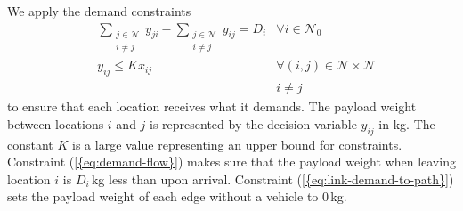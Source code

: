 \documentclass[journal]{IEEEtran}
\begin{document}
We apply the demand constraints
\begin{subequations}
\label{eq:demand-constraints}
\begin{align}
& {\ensuremath{\sum_{\substack {{j} \in {\ensuremath{\mathcal{N}}} \\ {i} \neq {j}}}}} {\ensuremath{{\ensuremath{y}}_{{j} {i}}}} - {\ensuremath{\sum_{\substack {{j} \in {\ensuremath{\mathcal{N}}} \\ {i} \neq {j}}}}} {\ensuremath{{\ensuremath{y}}_{{i} {j}}}} = {\ensuremath{D_{{i}}}} & {\ensuremath{\forall {i} \in {\ensuremath{{\ensuremath{\mathcal{N}}}_{0}}}}} \label{eq:demand-flow} \\
& {\ensuremath{{\ensuremath{y}}_{{i} {j}}}} \leq {\ensuremath{K}} {\ensuremath{x_{{i} {j}}}} & {\ensuremath{\forall({i},{j}) \in {\ensuremath{\mathcal{N}}} \times {\ensuremath{\mathcal{N}}}}} \label{eq:link-demand-to-path}\\
& & i \neq j \nonumber
\end{align}
\end{subequations}
to ensure that each location receives what it demands. The payload weight between locations $i$ and $j$ is represented by the decision variable ${\ensuremath{{\ensuremath{y}}_{{i} {j}}}}$ in kg. The constant ${\ensuremath{K}}$ is a large value representing an upper bound for constraints. Constraint {(\ref{{eq:demand-flow}})} makes sure that the payload weight when leaving location $i$ is ${\ensuremath{D_{{i}}}}$\,kg less than upon arrival. Constraint {(\ref{{eq:link-demand-to-path}})} sets the payload weight of each edge without a vehicle to 0\,kg.
\end{document}
